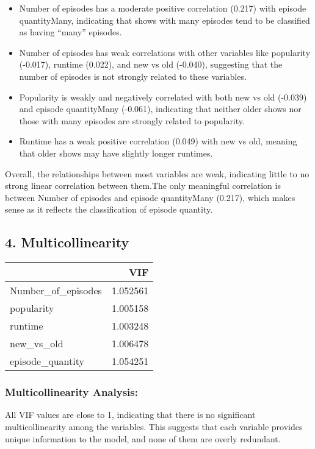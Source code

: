 \documentclass[
]{article}
\providecommand{\tightlist}{%
  \setlength{\itemsep}{0pt}\setlength{\parskip}{0pt}}
\begin{document}
\begin{itemize}
\tightlist
\item
  Number of episodes has a moderate positive correlation (0.217) with
  episode quantityMany, indicating that shows with many episodes tend to
  be classified as having ``many'' episodes.
\item
  Number of episodes has weak correlations with other variables like
  popularity (-0.017), runtime (0.022), and new vs old (-0.040),
  suggesting that the number of episodes is not strongly related to
  these variables.
\item
  Popularity is weakly and negatively correlated with both new vs old
  (-0.039) and episode quantityMany (-0.061), indicating that neither
  older shows nor those with many episodes are strongly related to
  popularity.
\item
  Runtime has a weak positive correlation (0.049) with new vs old,
  meaning that older shows may have slightly longer runtimes.
\end{itemize}

Overall, the relationships between most variables are weak, indicating
little to no strong linear correlation between them.The only meaningful
correlation is between Number of episodes and episode quantityMany
(0.217), which makes sense as it reflects the classification of episode
quantity.

\subsection{4. Multicollinearity}\label{multicollinearity}

\begin{longtable}[]{@{}lr@{}}
\toprule\noalign{}
& VIF \\
\midrule\noalign{}
\endhead
\bottomrule\noalign{}
\endlastfoot
Number\_of\_episodes & 1.052561 \\
popularity & 1.005158 \\
runtime & 1.003248 \\
new\_vs\_old & 1.006478 \\
episode\_quantity & 1.054251 \\
\end{longtable}

\subsubsection{Multicollinearity
Analysis:}\label{multicollinearity-analysis}

All VIF values are close to 1, indicating that there is no significant
multicollinearity among the variables. This suggests that each variable
provides unique information to the model, and none of them are overly
redundant.
\end{document}
